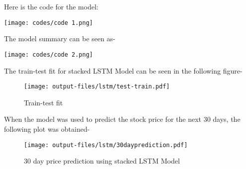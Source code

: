 \documentclass[12pt]{article}
\begin{document}
Here is the code for the model:
\begin{center}
    \texttt{[image: codes/code 1.png]}
\end{center}
The model summary can be seen as-
\begin{center}
    \texttt{[image: codes/code 2.png]}
\end{center}
                                                                 
                                                                 
                                                                 
                                                                 
The train-test fit for stacked LSTM Model can be seen in the following figure- 
\begin{figure}[H]
    {\centering
    \texttt{[image: output-files/lstm/test-train.pdf]}
    \caption{Train-test fit}
    \label{fig:enter-label}\par}
\end{figure}
\pagebreak
\noindent When the model was used to predict the stock price for the next 30 days, the following plot was obtained-
\begin{figure}[H]
    \centering
    \texttt{[image: output-files/lstm/30dayprediction.pdf]}
    \caption{30 day price prediction using stacked LSTM Model}
    \label{fig:enter-label}
\end{figure}
\end{document}
